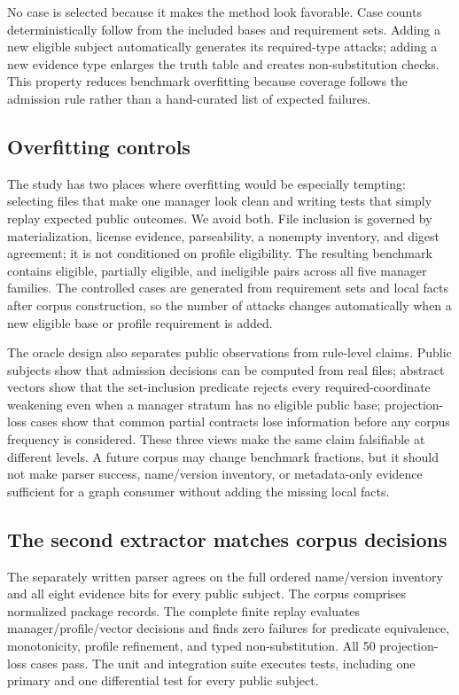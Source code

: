 \documentclass[10pt,conference]{IEEEtran}
\begin{document}
No case is selected because it makes the method look favorable. Case counts deterministically follow from the included bases and requirement sets. Adding a new eligible subject automatically generates its required-type attacks; adding a new evidence type enlarges the truth table and creates non-substitution checks. This property reduces benchmark overfitting because coverage follows the admission rule rather than a hand-curated list of expected failures.

\subsection{Overfitting controls}
The study has two places where overfitting would be especially tempting: selecting files that make one manager look clean and writing tests that simply replay expected public outcomes. We avoid both. File inclusion is governed by materialization, license evidence, parseability, a nonempty inventory, and digest agreement; it is not conditioned on profile eligibility. The resulting benchmark contains eligible, partially eligible, and ineligible pairs across all five manager families. The controlled cases are generated from requirement sets and local facts after corpus construction, so the number of attacks changes automatically when a new eligible base or profile requirement is added.

The oracle design also separates public observations from rule-level claims. Public subjects show that admission decisions can be computed from real files; abstract vectors show that the set-inclusion predicate rejects every required-coordinate weakening even when a manager stratum has no eligible public base; projection-loss cases show that common partial contracts lose information before any corpus frequency is considered. These three views make the same claim falsifiable at different levels. A future corpus may change benchmark fractions, but it should not make parser success, name/version inventory, or metadata-only evidence sufficient for a graph consumer without adding the missing local facts.

\subsection{The second extractor matches corpus decisions}
The separately written parser agrees on the full ordered name/version inventory and all eight evidence bits for every public subject. The corpus comprises \PackageCount{} normalized package records. The complete finite replay evaluates \ProofDecisions{} manager/profile/vector decisions and finds zero failures for predicate equivalence, monotonicity, profile refinement, and typed non-substitution. All 50 projection-loss cases pass. The unit and integration suite executes \UnitTests{} tests, including one primary and one differential test for every public subject.
\end{document}
